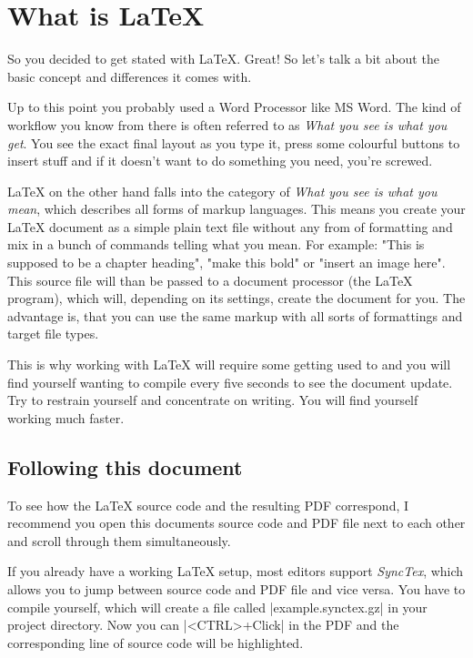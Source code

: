 \chapter{What is LaTeX} \label{chap: latex}
    So you decided to get stated with LaTeX. Great! So let's talk a bit about the basic concept and differences it comes with.

    \medskip
    Up to this point you probably used a Word Processor like MS Word. The kind of workflow you know from there is often referred to as \emph{What you
    see is what you get}. You see the exact final layout as you type it, press some colourful buttons to insert stuff and if it doesn't want to do
    something you need, you're screwed.

    LaTeX on the other hand falls into the category of \emph{What you see is what you mean}, which describes all forms of markup languages. This means
    you create your LaTeX document as a simple plain text file without any from of formatting and mix in a bunch of commands telling what you mean.
    For example: "This is supposed to be a chapter heading", "make this bold" or "insert an image here". This source file will than be passed to a
    document processor (the LaTeX program), which will, depending on its settings, create the document for you. The advantage is, that you can use the
    same markup with all sorts of formattings and target file types.

    This is why working with LaTeX will require some getting used to and you will find yourself wanting to compile every five seconds to see the
    document update. Try to restrain yourself and concentrate on writing. You will find yourself working much faster.

    \section{Following this document}
        To see how the LaTeX source code and the resulting PDF correspond, I recommend you open this documents source code and PDF file next to each
        other and scroll through them simultaneously.

        If you already have a working LaTeX setup, most editors support \emph{SyncTex}, which allows you to jump between source code and PDF file and
        vice versa. You have to compile yourself, which will create a file called |example.synctex.gz| in your project directory. Now you
        can |<CTRL>+Click| in the PDF and the corresponding line of source code will be highlighted.

